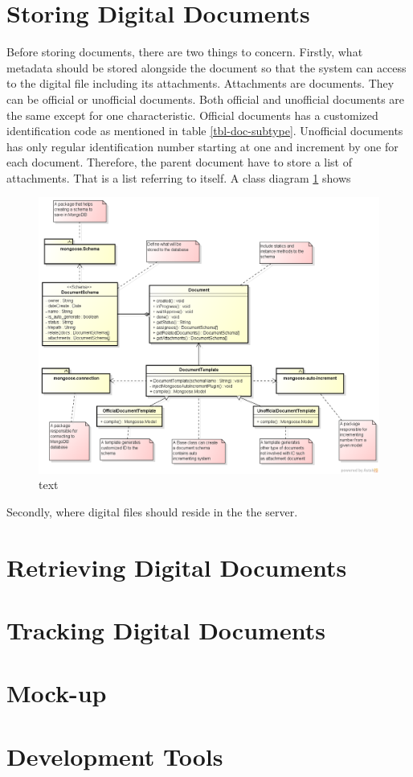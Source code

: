 \section{Storing Digital Documents}
Before storing documents, there are two things to concern.
Firstly, what metadata should be stored alongside the document so that the system can access to the digital file including its attachments.
Attachments are documents.
They can be official or unofficial documents.
Both official and unofficial documents are the same except for one characteristic.
Official documents has a customized identification code as mentioned in table \ref{tbl-doc-subtype}.
Unofficial documents has only regular identification number starting at one and increment by one for each document.
Therefore, the parent document have to store a list of attachments.
That is a list referring to itself.
A class diagram \ref{fig-doc-template} shows 
\begin{figure}
	\label{fig-doc-template}
	\caption{text}
	\includegraphics[scale=0.5]{res/software-design/document_templating}
\end{figure}

Secondly, where digital files should reside in the the server.


\section{Retrieving Digital Documents}

\section{Tracking Digital Documents}

\section{Mock-up}

\section{Development Tools}